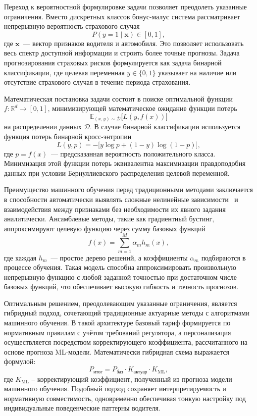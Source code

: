 Переход к вероятностной формулировке задачи позволяет преодолеть указанные ограничения. Вместо дискретных классов бонус-малус система рассматривает непрерывную вероятность страхового случая
\[
P(y = 1 \mid \mathbf{x}) \in [0, 1],
\]
где $\mathbf{x}$~--- вектор признаков водителя и автомобиля. Это позволяет использовать весь спектр доступной информации и строить более точные прогнозы. Задача прогнозирования страховых рисков формулируется как задача бинарной классификации, где целевая переменная $y \in \{0, 1\}$ указывает на наличие или отсутствие страхового случая в течение периода страхования.

Математическая постановка задачи состоит в поиске оптимальной функции $f \colon \mathbb{R}^d \to [0, 1]$, минимизирующей математическое ожидание функции потерь
\[
\mathbb{E}_{(x,y)\sim\mathcal{D}}\bigl[L(y, f(x))\bigr]
\]
на распределении данных $\mathcal{D}$. В случае бинарной классификации используется функция потерь бинарной кросс-энтропии
\[
L(y, p) = -\bigl[ y \log p + (1-y) \log(1-p) \bigr],
\]
где $p = f(x)$~--- предсказанная вероятность положительного класса. Минимизация этой функции потерь эквивалентна максимизации правдоподобия данных при условии Бернуллиевского распределения целевой переменной.

Преимущество машинного обучения перед традиционными методами заключается в способности автоматически выявлять сложные нелинейные зависимости~\cite{hastie2009elements} и взаимодействия между признаками без необходимости их явного задания аналитически. Ансамблевые методы, такие как градиентный бустинг, аппроксимируют целевую функцию через сумму базовых функций
\[
f(x) = \sum_{m=1}^{M} \alpha_m h_m(x),
\]
где каждая $h_m$~--- простое дерево решений, а коэффициенты $\alpha_m$ подбираются в процессе обучения. Такая модель способна аппроксимировать произвольную непрерывную функцию с любой заданной точностью при достаточном числе базовых функций, что обеспечивает высокую гибкость и точность прогнозов.

Оптимальным решением, преодолевающим указанные ограничения, является гибридный подход, сочетающий традиционные актуарные методы с алгоритмами машинного обучения. В такой архитектуре базовый тариф формируется по нормативным правилам с учётом требований регулятора, а персонализация осуществляется посредством корректирующего коэффициента, рассчитанного на основе прогноза ML-модели. Математически гибридная схема выражается формулой:
\[
P_{\text{итог}} = P_{\text{баз}} \cdot K_{\text{актуар}} \cdot K_{\text{ML}},
\]
где $K_{\text{ML}}$ – корректирующий коэффициент, полученный из прогноза модели машинного обучения. Подобный подход сохраняет интерпретируемость и нормативную совместимость, одновременно обеспечивая тонкую настройку под индивидуальные поведенческие паттерны водителя.

